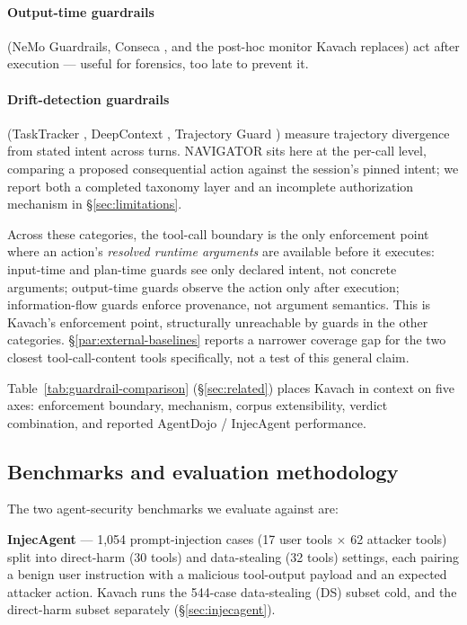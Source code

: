 \paragraph{Output-time guardrails} (NeMo Guardrails, Conseca
\cite{tsai2025conseca}, and the post-hoc monitor Kavach replaces) act
after execution --- useful for forensics, too late to prevent it.

\paragraph{Drift-detection guardrails} (TaskTracker
\cite{abdelnabi2024tasktracker}, DeepContext
\cite{albrethsen2026deepcontext}, Trajectory Guard
\cite{advani2026trajectoryguard}) measure trajectory divergence from
stated intent across turns. NAVIGATOR sits here at the per-call level,
comparing a proposed consequential action against the session's pinned
intent; we report both a completed taxonomy layer and an incomplete
authorization mechanism in \S\ref{sec:limitations}.

Across these categories, the tool-call boundary is the only enforcement point
where an action's \emph{resolved runtime arguments} are available before it
executes: input-time and plan-time guards see only declared intent, not
concrete arguments; output-time guards observe the action only after
execution; information-flow guards enforce provenance, not argument
semantics. This is Kavach's enforcement point, structurally unreachable by
guards in the other categories. \S\ref{par:external-baselines} reports a
narrower coverage gap for the two closest tool-call-content tools
specifically, not a test of this general claim.

Table~\ref{tab:guardrail-comparison} (\S\ref{sec:related}) places Kavach in
context on five axes: enforcement boundary, mechanism, corpus extensibility,
verdict combination, and reported AgentDojo / InjecAgent performance.

\subsection{Benchmarks and evaluation methodology}

The two agent-security benchmarks we evaluate against are:

\textbf{InjecAgent} \cite{zhan2024injecagent} --- 1,054 prompt-injection
cases (17 user tools $\times$ 62 attacker tools) split into direct-harm (30
tools) and data-stealing (32 tools) settings, each pairing a benign user
instruction with a malicious tool-output payload and an expected attacker
action. Kavach runs the 544-case data-stealing (DS) subset cold, and the
direct-harm subset separately (\S\ref{sec:injecagent}).

